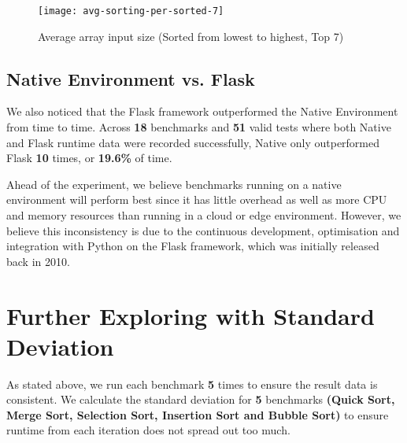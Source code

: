 \bigskip
\begin{figure}[hp]
\centering
\texttt{[image: avg-sorting-per-sorted-7]}
\caption{\footnotesize{Average array input size (Sorted from lowest to highest, Top 7)}}
\captionsetup{aboveskip=0pt,font=it}
\end{figure}
\bigskip

\subsection{Native Environment vs. Flask}

We also noticed that the Flask framework outperformed the Native Environment from time to time. Across \textbf{18} benchmarks and \textbf{51} valid tests where both Native and Flask runtime data were recorded successfully, Native only outperformed Flask \textbf{10} times, or \textbf{19.6\%} of time.

Ahead of the experiment, we believe benchmarks running on a native environment will perform best since it has little overhead as well as more CPU and memory resources than running in a cloud or edge environment. However, we believe this inconsistency is due to the continuous development, optimisation and integration with Python on the Flask framework, which was initially released back in 2010.

\bigskip
\section{Further Exploring with Standard Deviation}

As stated above, we run each benchmark \textbf{5} times to ensure the result data is consistent. We calculate the standard deviation for \textbf{5} benchmarks \textbf{(Quick Sort, Merge Sort, Selection Sort, Insertion Sort and Bubble Sort)} to ensure runtime from each iteration does not spread out too much.

